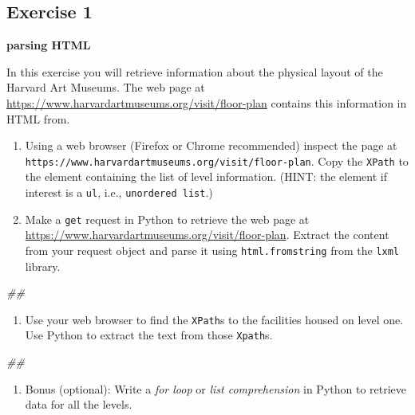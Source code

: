 \documentclass[]{book}
\newenvironment{Shaded}{\begin{snugshade}}{\end{snugshade}}
\newcommand{\CommentTok}[1]{\textcolor[rgb]{0.56,0.35,0.01}{\textit{#1}}}
\providecommand{\tightlist}{%
  \setlength{\itemsep}{0pt}\setlength{\parskip}{0pt}}
\begin{document}
\subsection{Exercise 1}\label{exercise-1-5}

\textbf{parsing HTML}

In this exercise you will retrieve information about the physical layout
of the Harvard Art Museums. The web page at
\url{https://www.harvardartmuseums.org/visit/floor-plan} contains this
information in HTML from.

\begin{enumerate}
\def\labelenumi{\arabic{enumi}.}
\item
  Using a web browser (Firefox or Chrome recommended) inspect the page
  at \texttt{https://www.harvardartmuseums.org/visit/floor-plan}. Copy
  the \texttt{XPath} to the element containing the list of level
  information. (HINT: the element if interest is a \texttt{ul}, i.e.,
  \texttt{unordered\ list}.)
\item
  Make a \texttt{get} request in Python to retrieve the web page at
  \url{https://www.harvardartmuseums.org/visit/floor-plan}. Extract the
  content from your request object and parse it using
  \texttt{html.fromstring} from the \texttt{lxml} library.
\end{enumerate}

\begin{Shaded}
\begin{Highlighting}[]
\CommentTok{##}
\end{Highlighting}
\end{Shaded}

\begin{enumerate}
\def\labelenumi{\arabic{enumi}.}
\setcounter{enumi}{2}
\tightlist
\item
  Use your web browser to find the \texttt{XPath}s to the facilities
  housed on level one. Use Python to extract the text from those
  \texttt{Xpath}s.
\end{enumerate}

\begin{Shaded}
\begin{Highlighting}[]
\CommentTok{##}
\end{Highlighting}
\end{Shaded}

\begin{enumerate}
\def\labelenumi{\arabic{enumi}.}
\setcounter{enumi}{3}
\tightlist
\item
  Bonus (optional): Write a \emph{for loop} or \emph{list comprehension}
  in Python to retrieve data for all the levels.
\end{enumerate}
\end{document}
